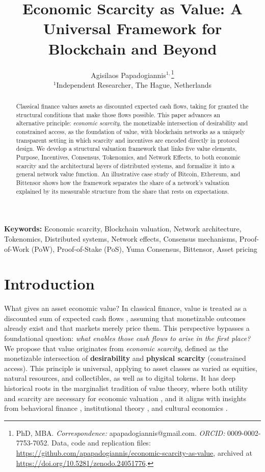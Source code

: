 \documentclass[12pt]{article}
\title{Economic Scarcity as Value: A Universal Framework for Blockchain and Beyond}
\author{Agisilaos Papadogiannis$^{1,}$\thanks{
PhD, MBA. \textit{Correspondence:} apapadogiannis@gmail.com. \textit{ORCID:} 0009-0002-7753-7052. Data, code and replication files: \url{https://github.com/apapadogiannis/economic-scarcity-as-value}, archived at \url{https://doi.org/10.5281/zenodo.24051776}.
}\\[0.5em]
{\normalsize $^{1}$Independent Researcher, The Hague, Netherlands}}
\begin{document}
\maketitle

\begin{abstract}
Classical finance values assets as discounted expected cash flows, taking for granted the structural conditions that make those flows possible. This paper advances an alternative principle: \emph{economic scarcity}, the monetizable intersection of desirability and constrained access, as the foundation of value, with blockchain networks as a uniquely transparent setting in which scarcity and incentives are encoded directly in protocol design. We develop a structural valuation framework that links five value elements, Purpose, Incentives, Consensus, Tokenomics, and Network Effects, to both economic scarcity and the architectural layers of distributed systems, and formalize it into a general network value function. An illustrative case study of Bitcoin, Ethereum, and Bittensor shows how the framework separates the share of a network's valuation explained by its measurable structure from the share that rests on expectations.
\end{abstract}

\vspace{1em}
\noindent\textbf{Keywords:} Economic scarcity, Blockchain valuation, Network architecture, Tokenomics, Distributed systems, Network effects, Consensus mechanisms, Proof-of-Work (PoW), Proof-of-Stake (PoS), Yuma Consensus, Bittensor, Asset pricing



\section{Introduction}

What gives an asset economic value? In classical finance, value is treated as a discounted sum of expected cash flows \citep{williams1938theory, damodaran2012investment}, assuming that monetizable outcomes already exist and that markets merely price them. This perspective bypasses a foundational question: \textit{what enables those cash flows to arise in the first place?} We propose that value originates from \emph{economic scarcity}, defined as the monetizable intersection of \textbf{desirability} and \textbf{physical scarcity} (constrained access). This principle is universal, applying to asset classes as varied as equities, natural resources, and collectibles, as well as to digital tokens. It has deep historical roots in the marginalist tradition of value theory, where both utility and scarcity are necessary for economic valuation \citep{jevons1871political, menger1871principles}, and it aligns with insights from behavioral finance \citep{barberis1998investor, hong2007disagreement}, institutional theory \citep{merton1987simple, pagano1998choice}, and cultural economics \citep{lin2025culture}.
\end{document}

